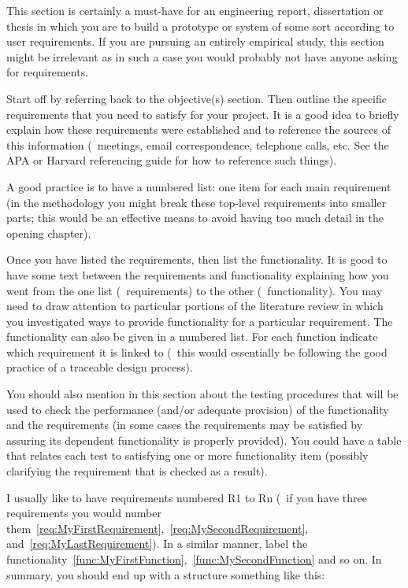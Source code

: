 This section is certainly a must-have for an engineering report, dissertation or thesis in which you are to build a prototype or system of some sort according to user requirements.  If you are pursuing an entirely empirical study, this section might be irrelevant as in such a case you would probably not have anyone asking for requirements.

Start off by referring back to the objective(s) section. Then outline the specific requirements that you need to satisfy for your project. It is a good idea to briefly explain how these requirements were established and to reference the sources of this information (\eg~meetings, email correspondence, telephone calls, etc.  See the APA or Harvard referencing guide for how to reference such things).

A good practice is to have a numbered list: one item for each main requirement (in the methodology you might break these top-level requirements into smaller parts; this would be an effective means to avoid having too much detail in the opening chapter).

Once you have listed the requirements, then list the functionality. It is good to have some text between the requirements and functionality explaining how you went from the one list (\ie~requirements) to the other (\ie~functionality).  You may need to draw attention to particular portions of the literature review in which you investigated ways to provide functionality for a particular requirement. The functionality can also be given in a numbered list. For each function indicate which requirement it is linked to (\ie~this would essentially be following the good practice of a traceable design process).

You should also mention in this section about the testing procedures that will be used to check the performance (and/or adequate provision) of the functionality and the requirements (in some cases the requirements may be satisfied by assuring its dependent functionality is properly provided). You could have a table that relates each test to satisfying one or more functionality item (possibly clarifying the requirement that is checked as a result).

I usually like to have requirements numbered R1 to Rn (\ie~if you have three requirements you would number them~\ref{req:MyFirstRequirement},~\ref{req:MySecondRequirement}, and~\ref{req:MyLastRequirement}). In a similar manner, label the functionality~\ref{func:MyFirstFunction},~\ref{func:MySecondFunction} and so on.
In summary, you should end up with a structure something like this:

